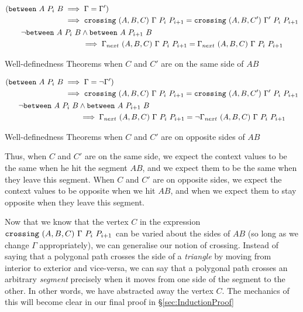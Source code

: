 \begin{boxedfigure}
  \begin{gather}
    \begin{split}
      (\texttt{between}\ A\ P_i\ B&\implies \Gamma = \Gamma')\\
      &\implies\texttt{crossing}\ (A,B,C)\ \Gamma\ P_i\ P_{i+1} = \texttt{crossing}\ (A,B,C')\ \Gamma'\ P_i\ P_{i+1}
    \end{split}\\
    \begin{split}
      \neg\texttt{between}\ A\ P_i\ B&\wedge\texttt{between}\ A\ P_{i+1}\ B\\
      &\implies \Gamma_{next}\ (A,B,C)\ \Gamma\ P_i\ P_{i+1} = \Gamma_{next}\ (A,B,C)\ \Gamma\ P_i\ P_{i+1}
    \end{split}
  \end{gather}
  \caption{Well-definedness Theorems when $C$ and $C'$ are on the same side of $AB$}
  \label{fig:CrossChange1}
\end{boxedfigure}

\begin{boxedfigure}
  \begin{gather}
    \begin{split}
      (\texttt{between}\ A\ P_i\ B&\implies \Gamma = \neg\Gamma')\\
      &\implies\texttt{crossing}\ (A,B,C)\ \Gamma\ P_i\ P_{i+1} = \texttt{crossing}\ (A,B,C')\ \Gamma'\ P_i\ P_{i+1}
    \end{split}\\
    \begin{split}
      \neg\texttt{between}\ A\ P_i\ B&\wedge\texttt{between}\ A\ P_{i+1}\ B\\
      &\implies \Gamma_{next}\ (A,B,C)\ \Gamma\ P_i\ P_{i+1} = \neg\Gamma_{next}\ (A,B,C)\ \Gamma\ P_i\ P_{i+1}
    \end{split}
  \end{gather}
  \caption{Well-definedness Theorems when $C$ and $C'$ are on opposite sides of $AB$}
  \label{fig:CrossChange2}
\end{boxedfigure}

Thus, when $C$ and $C'$ are on the same side, we expect the context values to be the same when he hit the segment $AB$, and we expect them to be the same when they leave this segment. When $C$ and $C'$ are on opposite sides, we expect the context values to be opposite when we hit $AB$, and when we expect them to stay opposite when they leave this segment. 

Now that we know that the vertex $C$ in the expression $\code{crossing}\ (A,B,C)\ \Gamma\ P_i\ P_{i+1}$ can be varied about the sides of $AB$ (so long as we change $\Gamma$ appropriately), we can generalise our notion of crossing. Instead of saying that a polygonal path crosses the side of a  \emph{triangle} by moving from interior to exterior and vice-versa, we can say that a polygonal path crosses an arbitrary \emph{segment} precisely when it moves from one side of the segment to the other. In other words, we have abstracted away the vertex $C$. The mechanics of this will become clear in our final proof in \S\ref{sec:InductionProof}


